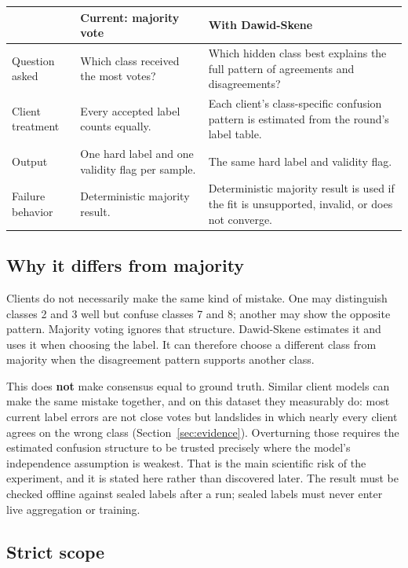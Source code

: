 \documentclass[10pt,a4paper]{article}
\begin{document}
\begin{table}[H]
\centering
\begin{tabularx}{\textwidth}{L{0.24\textwidth}YY}
\toprule
 & \textbf{Current: majority vote} & \textbf{With Dawid-Skene} \\
\midrule
Question asked & Which class received the most votes? & Which hidden class best explains the full
pattern of agreements and disagreements? \\
Client treatment & Every accepted label counts equally. & Each client's class-specific confusion
pattern is estimated from the round's label table. \\
Output & One hard label and one validity flag per sample. & The same hard label and validity flag. \\
Failure behavior & Deterministic majority result. & Deterministic majority result is used if the fit
is unsupported, invalid, or does not converge. \\
\bottomrule
\end{tabularx}
\end{table}

\subsection{Why it differs from majority}

Clients do not necessarily make the same kind of mistake. One may distinguish classes 2 and 3 well
but confuse classes 7 and 8; another may show the opposite pattern. Majority voting ignores that
structure. Dawid-Skene estimates it and uses it when choosing the label. It can therefore choose a
different class from majority when the disagreement pattern supports another class.

This does \textbf{not} make consensus equal to ground truth. Similar client models can make the same
mistake together, and on this dataset they measurably do: most current label errors are not close
votes but landslides in which nearly every client agrees on the wrong class
(Section~\ref{sec:evidence}). Overturning
those requires the estimated confusion structure to be trusted precisely where the model's
independence assumption is weakest. That is the main scientific risk of the experiment, and it is
stated here rather than discovered later. The result must be checked offline against sealed labels
after a run; sealed labels must never enter live aggregation or training.

\subsection{Strict scope}
\end{document}
